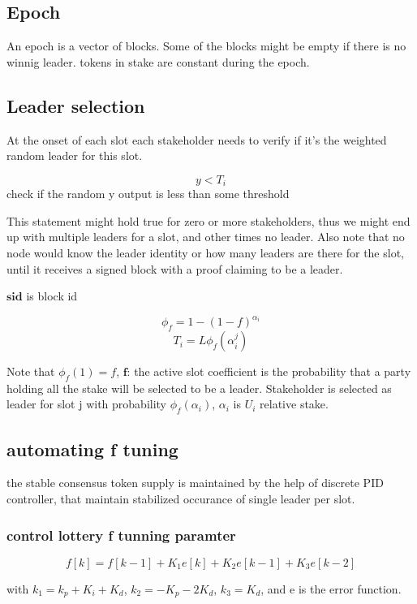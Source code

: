 \documentclass{article}
\begin{document}
\subsection{ Epoch}

An epoch is a vector of blocks. Some of the  blocks might be empty if there is no winnig leader. tokens in stake are constant during the epoch.

\subsection{ Leader selection}

At the onset of each slot each stakeholder needs to verify if it's
the weighted random leader for this slot.

$$y < T_{i}$$ check if the random y output is less than some
threshold

This statement might hold true for zero or more stakeholders, thus
we might end up with multiple leaders for a slot, and other times no
leader. Also note that no node would know the leader identity or how many
leaders are there for the slot, until it receives a signed block with
a proof claiming to be a leader.


$\textbf{sid}$ is block id

$$\phi_{f} = 1 - (1-f)^{\alpha_i}$$ $$T_{i} =
L \phi_{f}(\alpha_i^j)$$

Note that $\phi_f(1)=f$, $\textbf{f}$: the active slot coefficient is
the probability that a party holding all the stake will be selected to be
a leader. Stakeholder is selected as leader for slot j with probability
$\phi_f(\alpha_i)$, $\alpha_i$ is $U_i$ relative stake.


\subsection{ automating f tuning}

the stable consensus token supply is maintained by the help of discrete PID controller, that maintain stabilized occurance of single leader per slot.

\subsubsection{ control lottery f tunning paramter }

$$f[k] = f[k-1] + K_1e[k] + K_2e[k-1] + K_3e[k-2]$$

with $k_1 = k_p + K_i + K_d$,  $k_2 = -K_p -2K_d$,  $k_3 = K_d$, and e is the error function.
\end{document}
